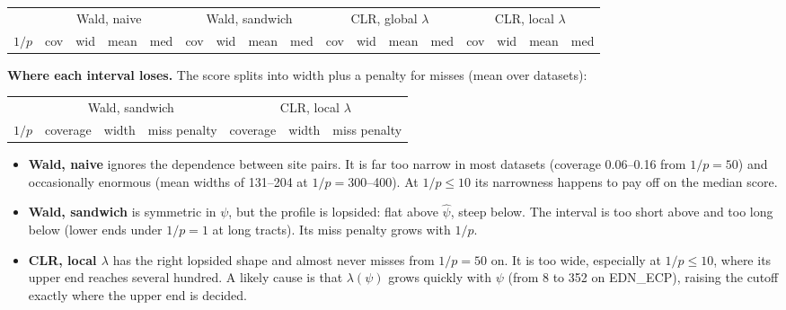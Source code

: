 \documentclass[11pt]{article}
\begin{document}
\begin{center}\footnotesize
\setlength{\tabcolsep}{3pt}
\begin{tabular}{r cccc cccc cccc cccc}
\toprule
& \multicolumn{4}{c}{Wald, naive} & \multicolumn{4}{c}{Wald, sandwich} & \multicolumn{4}{c}{CLR, global $\lambda$} & \multicolumn{4}{c}{CLR, local $\lambda$} \\
\cmidrule(lr){2-5}\cmidrule(lr){6-9}\cmidrule(lr){10-13}\cmidrule(lr){14-17}
$1/p$ & cov & wid & mean & med & cov & wid & mean & med & cov & wid & mean & med & cov & wid & mean & med \\
\midrule
\bottomrule
\end{tabular}
\end{center}

\textbf{Where each interval loses.} The score splits into width plus a penalty for misses (mean over datasets):

\begin{center}\small
\begin{tabular}{r ccc ccc}
\toprule
& \multicolumn{3}{c}{Wald, sandwich} & \multicolumn{3}{c}{CLR, local $\lambda$} \\
\cmidrule(lr){2-4}\cmidrule(lr){5-7}
$1/p$ & coverage & width & miss penalty & coverage & width & miss penalty \\
\midrule
\bottomrule
\end{tabular}
\end{center}

\begin{itemize}
\item \textbf{Wald, naive} ignores the dependence between site pairs. It is far too narrow in most datasets (coverage 0.06--0.16 from $1/p = 50$) and occasionally enormous (mean widths of 131--204 at $1/p = 300$--400). At $1/p \le 10$ its narrowness happens to pay off on the median score.
\item \textbf{Wald, sandwich} is symmetric in $\psi$, but the profile is lopsided: flat above $\hat\psi$, steep below. The interval is too short above and too long below (lower ends under $1/p = 1$ at long tracts). Its miss penalty grows with $1/p$.
\item \textbf{CLR, local $\lambda$} has the right lopsided shape and almost never misses from $1/p = 50$ on. It is too wide, especially at $1/p \le 10$, where its upper end reaches several hundred. A likely cause is that $\lambda(\psi)$ grows quickly with $\psi$ (from 8 to 352 on EDN\_ECP), raising the cutoff exactly where the upper end is decided.
\end{itemize}
\end{document}
